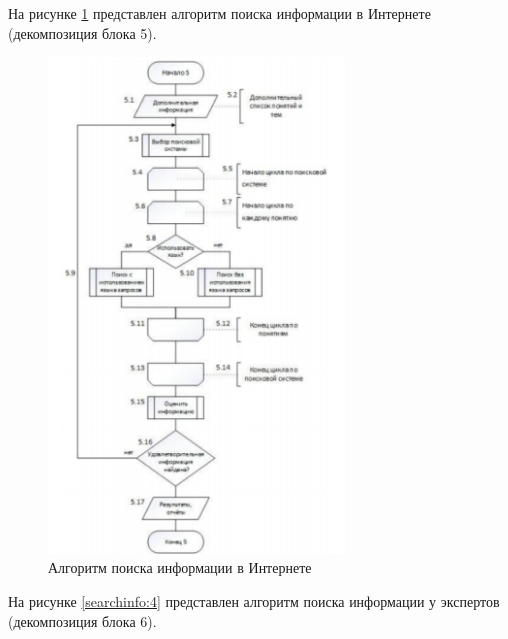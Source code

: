     \pagebreak

	На рисунке \ref{searchinfo:3} представлен алгоритм поиска информации в Интернете
(декомпозиция блока 5).

	\begin{figure}[h!]
		\centering
		\includegraphics[width=0.7\textwidth]{images/searchinfo/3.png}
		\caption{Алгоритм поиска информации в Интернете}
		\label{searchinfo:3}
    \end{figure}

    \pagebreak

	На рисунке \ref{searchinfo:4} представлен алгоритм поиска информации у экспертов (декомпозиция блока 6).

